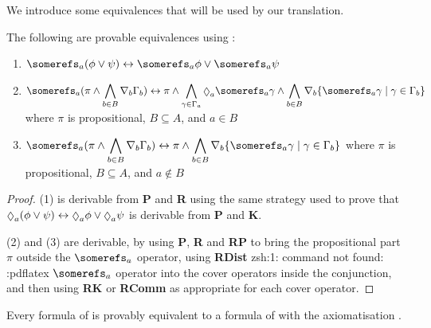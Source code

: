 We introduce some equivalences that will be used by our translation.

\begin{lemma}\label{k-equivalences}
The following are provable equivalences using \axiomKF{}:
\begin{enumerate}
\item $\displaystyle \somerefs_a (\phi \lor \psi) \iff
\somerefs_a \phi \lor \somerefs_a \psi$
\item $\displaystyle \somerefs_a (\pi \land \bigwedge_{b
\in B} \covers_b \Gamma_b) \iff \pi \land \bigwedge_{\gamma \in \Gamma_a}
\suspects_a \somerefs_a \gamma \land \bigwedge_{b \in B} \covers_b \{\somerefs_a
\gamma \mid \gamma \in \Gamma_b\}$ where $\pi$ is propositional, $B \subseteq
A$, and $a \in B$
\item $\displaystyle \somerefs_a (\pi \land \bigwedge_{b
\in B} \covers_b \Gamma_b) \iff \pi \land \bigwedge_{b \in B} \covers_b
\{\somerefs_a \gamma \mid \gamma \in \Gamma_b\}$ where $\pi$ is propositional,
$B \subseteq A$, and $a \notin B$
\end{enumerate}
\end{lemma}

\begin{proof}
(1) is derivable from {\bf P} and {\bf R} using the same strategy used to prove
that $\suspects_a (\phi \lor \psi) \iff \suspects_a \phi \lor \suspects_a \psi$
is derivable from {\bf P} and {\bf K}.

(2) and (3) are derivable, by using {\bf P}, {\bf R} and {\bf RP} to bring the
propositional part $\pi$ outside the $\somerefs_a$ operator, using {\bf RDist}
zsh:1: command not found: :pdflatex
$\somerefs_a$ operator into the cover operators inside the conjunction, and then
using {\bf RK} or {\bf RComm} as appropriate for each cover operator.
\end{proof}

\begin{lemma}\label{k-translation}
Every formula of \langF{} is provably equivalent to a formula of \lang{} with
the axiomatisation \axiomKF{}.
\end{lemma}


